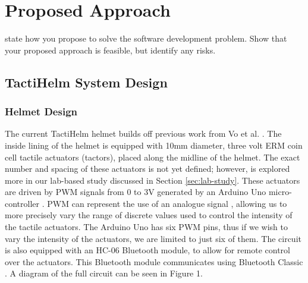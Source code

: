 \documentclass{interim}
\begin{document}
\section{Proposed Approach}

state how you propose to solve the software development problem. Show that your proposed approach is feasible, but identify any risks.

\subsection{TactiHelm System Design}
\subsubsection{Helmet Design}\label{sec:helmet-design}
The current TactiHelm helmet builds off previous work from Vo et al. \cite{10.1145/3411763.3451580}. The inside lining of the helmet is equipped with 10mm diameter, three volt ERM coin cell tactile actuators (tactors), placed along the midline of the helmet. The exact number and spacing of these actuators is not yet defined; however, is explored more in our lab-based study discussed in Section \ref{sec:lab-study}. These actuators are driven by PWM signals from 0 to 3V generated by an Arduino Uno micro-controller \cite{arduinouno}. PWM can represent the use of an analogue signal \cite{kart2001pulse}, allowing us to more precisely vary the range of discrete values used to control the intensity of the tactile actuators. The Arduino Uno has six PWM pins, thus if we wish to vary the intensity of the actuators, we are limited to just six of them. The circuit is also equipped with an HC-06 Bluetooth module, to allow for remote control over the actuators. This Bluetooth module communicates using Bluetooth Classic \cite{hc06}. A diagram of the full circuit can be seen in Figure 1.
\end{document}
